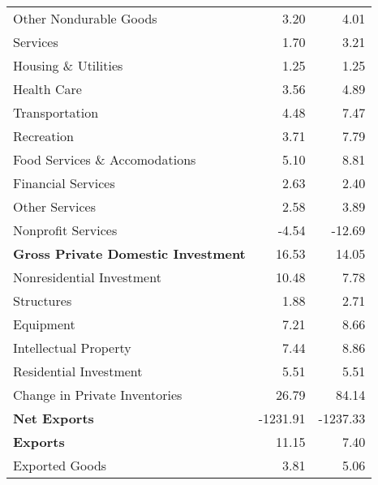 \documentclass[11pt, letterpaper]{article}\usepackage[]{graphicx}\usepackage[]{color}
\begin{document}
\begin{table}[H]
\begin{tabular}{lrr}
  \hspace{24mm}  Other Nondurable Goods & 3.20 & 4.01 \\ 
  \hspace{8mm}  Services & 1.70 & 3.21 \\ 
  \hspace{16mm}  Housing \& Utilities & 1.25 & 1.25 \\ 
  \hspace{16mm}  Health Care & 3.56 & 4.89 \\ 
  \hspace{16mm}  Transportation & 4.48 & 7.47 \\ 
  \hspace{16mm}  Recreation & 3.71 & 7.79 \\ 
  \hspace{16mm}  Food Services \& Accomodations & 5.10 & 8.81 \\ 
  \hspace{16mm}  Financial Services & 2.63 & 2.40 \\ 
  \hspace{16mm}  Other Services & 2.58 & 3.89 \\ 
  \hspace{16mm}  Nonprofit Services & -4.54 & -12.69 \\ 
  \hspace{0mm} \textbf{Gross Private Domestic Investment} & 16.53 & 14.05 \\ 
  \hspace{8mm}  Nonresidential Investment & 10.48 & 7.78 \\ 
  \hspace{16mm}  Structures & 1.88 & 2.71 \\ 
  \hspace{16mm}  Equipment & 7.21 & 8.66 \\ 
  \hspace{16mm}  Intellectual Property & 7.44 & 8.86 \\ 
  \hspace{8mm}  Residential Investment & 5.51 & 5.51 \\ 
  \hspace{8mm}  Change in Private Inventories & 26.79 & 84.14 \\ 
  \hspace{0mm} \textbf{Net Exports} & -1231.91 & -1237.33 \\ 
  \hspace{0mm} \textbf{Exports} & 11.15 & 7.40 \\ 
  \hspace{8mm}  Exported Goods & 3.81 & 5.06 \\ 

\end{tabular}
\end{table}
\end{document}
